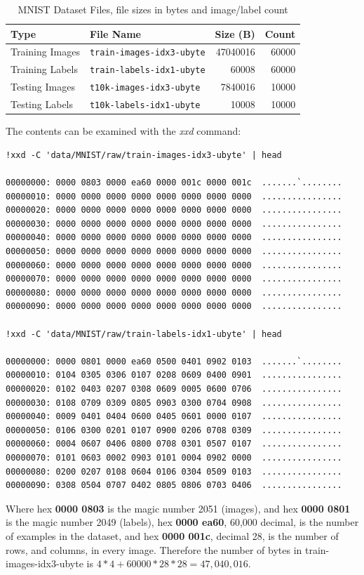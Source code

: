 \begin{table}[h]
\centering
\begin{tabular}{|l|l|r|r|}
\hline
\textbf{Type}             & \textbf{File Name}                       & \textbf{Size (B)} & \textbf{Count} \\ \hline
Training Images & \texttt{train-images-idx3-ubyte} & 47040016           & 60000 \\
Training Labels & \texttt{train-labels-idx1-ubyte} & 60008             & 60000 \\
Testing Images  & \texttt{t10k-images-idx3-ubyte}  & 7840016           & 10000 \\
Testing Labels  & \texttt{t10k-labels-idx1-ubyte}  & 10008              & 10000 \\ \hline
\end{tabular}
\caption{MNIST Dataset Files, file sizes in bytes and image/label count}
\label{table:mnist_files_b}
\end{table}
The contents can be examined with the \textit{xxd} command:
\begin{verbatim}
!xxd -C 'data/MNIST/raw/train-images-idx3-ubyte' | head

00000000: 0000 0803 0000 ea60 0000 001c 0000 001c  .......`........
00000010: 0000 0000 0000 0000 0000 0000 0000 0000  ................
00000020: 0000 0000 0000 0000 0000 0000 0000 0000  ................
00000030: 0000 0000 0000 0000 0000 0000 0000 0000  ................
00000040: 0000 0000 0000 0000 0000 0000 0000 0000  ................
00000050: 0000 0000 0000 0000 0000 0000 0000 0000  ................
00000060: 0000 0000 0000 0000 0000 0000 0000 0000  ................
00000070: 0000 0000 0000 0000 0000 0000 0000 0000  ................
00000080: 0000 0000 0000 0000 0000 0000 0000 0000  ................
00000090: 0000 0000 0000 0000 0000 0000 0000 0000  ................

!xxd -C 'data/MNIST/raw/train-labels-idx1-ubyte' | head

00000000: 0000 0801 0000 ea60 0500 0401 0902 0103  .......`........
00000010: 0104 0305 0306 0107 0208 0609 0400 0901  ................
00000020: 0102 0403 0207 0308 0609 0005 0600 0706  ................
00000030: 0108 0709 0309 0805 0903 0300 0704 0908  ................
00000040: 0009 0401 0404 0600 0405 0601 0000 0107  ................
00000050: 0106 0300 0201 0107 0900 0206 0708 0309  ................
00000060: 0004 0607 0406 0800 0708 0301 0507 0107  ................
00000070: 0101 0603 0002 0903 0101 0004 0902 0000  ................
00000080: 0200 0207 0108 0604 0106 0304 0509 0103  ................
00000090: 0308 0504 0707 0402 0805 0806 0703 0406  ................
\end{verbatim}
Where hex \textbf{0000 0803} is the magic number 2051 (images), and hex \textbf{0000 0801} is the magic number 2049 (labels), hex \textbf{0000 ea60}, 60,000 decimal, is the number of examples in the dataset, and hex \textbf{0000 001c}, decimal 28, is the number of rows, and columns, in every image. Therefore the number of bytes in train-images-idx3-ubyte is $4 * 4 + 60000 * 28 * 28 = 47,040,016$.

